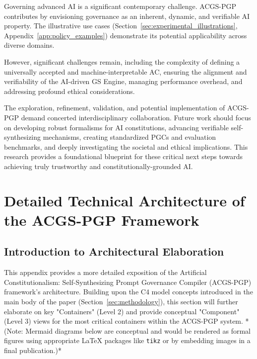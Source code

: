 \documentclass[sigconf,review,anonymous=false]{acmart} %
\begin{document}
Governing advanced AI is a significant contemporary challenge. ACGS-PGP contributes by envisioning governance as an inherent, dynamic, and verifiable AI property. The illustrative use cases (Section~\ref{sec:experimental_illustrations}, Appendix~\ref{app:policy_examples}) demonstrate its potential applicability across diverse domains.

However, significant challenges remain, including the complexity of defining a universally accepted and machine-interpretable AC, ensuring the alignment and verifiability of the AI-driven GS Engine, managing performance overhead, and addressing profound ethical considerations.

The exploration, refinement, validation, and potential implementation of ACGS-PGP demand concerted interdisciplinary collaboration. Future work should focus on developing robust formalisms for AI constitutions, advancing verifiable self-synthesizing mechanisms, creating standardized PGCs and evaluation benchmarks, and deeply investigating the societal and ethical implications. This research provides a foundational blueprint for these critical next steps towards achieving truly trustworthy and constitutionally-grounded AI.




\appendix

\section{Detailed Technical Architecture of the ACGS-PGP Framework}
\label{app:architecture}
\subsection{Introduction to Architectural Elaboration}
This appendix provides a more detailed exposition of the Artificial Constitutionalism: Self-Synthesizing Prompt Governance Compiler (ACGS-PGP) framework's architecture. Building upon the C4 model concepts introduced in the main body of the paper (Section~\ref{sec:methodology}), this section will further elaborate on key "Containers" (Level 2) and provide conceptual "Component" (Level 3) views for the most critical containers within the ACGS-PGP system. *(Note: Mermaid diagrams below are conceptual and would be rendered as formal figures using appropriate LaTeX packages like \texttt{tikz} or by embedding images in a final publication.)*
\end{document}
